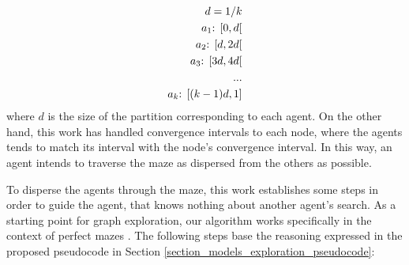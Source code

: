 \begin{equation}
	\begin{align}
			d = 1/k\\
		a_{1} \textnormal{: } [0, d[\\
		a_{2} \textnormal{: } [d, 2d[\\
		a_{3} \textnormal{: } [3d, 4d[\\
		...\\
		a_{k} \textnormal{: } [(k-1)d, 1]
	\end{align}
\end{equation}
where $d$ is the size of the partition corresponding to each agent. On the other hand, this work has handled convergence intervals to each node, where the agents tends to match its interval with the node's convergence interval. In this way, an agent intends to traverse the maze as dispersed from the others as possible.

To disperse the agents through the maze, this work establishes some steps in order to guide the agent, that knows nothing about another agent's search. As a starting point for graph exploration, our algorithm works specifically in the context of perfect mazes \cite{Muhammad2021}. The following steps base the reasoning expressed in the proposed pseudocode in Section \ref{section_models_exploration_pseudocode}:

